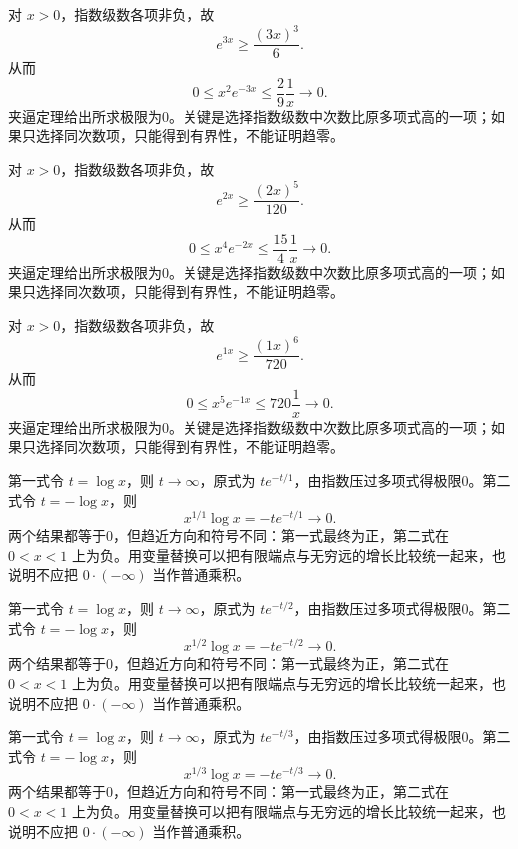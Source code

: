 \documentclass[UTF8,12pt,a4paper,fontset=fandol]{ctexart}
\begin{document}
\begin{solve}\label{ans:c4q10}
对 $x>0$，指数级数各项非负，故
\[
e^{3x}\ge\frac{(3x)^{3}}{6}.
\]
从而
\[
0\le x^{2}e^{-3x}\le \frac{2}{9}\frac1x\longrightarrow0.
\]
夹逼定理给出所求极限为0。关键是选择指数级数中次数比原多项式高的一项；如果只选择同次数项，只能得到有界性，不能证明趋零。
\end{solve}

\begin{solve}\label{ans:c4q11}
对 $x>0$，指数级数各项非负，故
\[
e^{2x}\ge\frac{(2x)^{5}}{120}.
\]
从而
\[
0\le x^{4}e^{-2x}\le \frac{15}{4}\frac1x\longrightarrow0.
\]
夹逼定理给出所求极限为0。关键是选择指数级数中次数比原多项式高的一项；如果只选择同次数项，只能得到有界性，不能证明趋零。
\end{solve}

\begin{solve}\label{ans:c4q12}
对 $x>0$，指数级数各项非负，故
\[
e^{1x}\ge\frac{(1x)^{6}}{720}.
\]
从而
\[
0\le x^{5}e^{-1x}\le 720\frac1x\longrightarrow0.
\]
夹逼定理给出所求极限为0。关键是选择指数级数中次数比原多项式高的一项；如果只选择同次数项，只能得到有界性，不能证明趋零。
\end{solve}

\begin{solve}\label{ans:c4q13}
第一式令 $t=\log x$，则 $t\to\infty$，原式为 $te^{-t/1}$，由指数压过多项式得极限0。第二式令 $t=-\log x$，则
\[
x^{1/1}\log x=-te^{-t/1}\longrightarrow0.
\]
两个结果都等于0，但趋近方向和符号不同：第一式最终为正，第二式在 $0<x<1$ 上为负。用变量替换可以把有限端点与无穷远的增长比较统一起来，也说明不应把 $0\cdot(-\infty)$ 当作普通乘积。
\end{solve}

\begin{solve}\label{ans:c4q14}
第一式令 $t=\log x$，则 $t\to\infty$，原式为 $te^{-t/2}$，由指数压过多项式得极限0。第二式令 $t=-\log x$，则
\[
x^{1/2}\log x=-te^{-t/2}\longrightarrow0.
\]
两个结果都等于0，但趋近方向和符号不同：第一式最终为正，第二式在 $0<x<1$ 上为负。用变量替换可以把有限端点与无穷远的增长比较统一起来，也说明不应把 $0\cdot(-\infty)$ 当作普通乘积。
\end{solve}

\begin{solve}\label{ans:c4q15}
第一式令 $t=\log x$，则 $t\to\infty$，原式为 $te^{-t/3}$，由指数压过多项式得极限0。第二式令 $t=-\log x$，则
\[
x^{1/3}\log x=-te^{-t/3}\longrightarrow0.
\]
两个结果都等于0，但趋近方向和符号不同：第一式最终为正，第二式在 $0<x<1$ 上为负。用变量替换可以把有限端点与无穷远的增长比较统一起来，也说明不应把 $0\cdot(-\infty)$ 当作普通乘积。
\end{solve}
\end{document}
